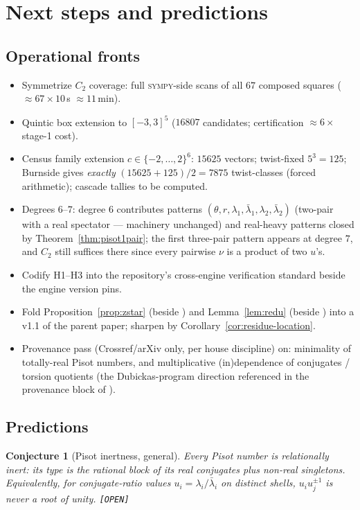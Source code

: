 \documentclass[11pt]{article}
\newcommand{\Op}{\textnormal{\texttt{[OPEN]}}}
\newcommand{\sy}{\textsc{sympy}}
\newtheorem{conjecture}[theorem]{Conjecture}
\theoremstyle{definition}
\begin{document}
\section{Next steps and predictions}\label{sec:next}

\subsection{Operational fronts}
\begin{itemize}
\item[\textbf{N1.}] Symmetrize $C_2$ coverage: full \sy-side scans of all $67$
composed squares ($\approx67\times10$\,s $\approx11$\,min).
\item[\textbf{N2.}] Quintic box extension to $[-3,3]^5$ ($16807$ candidates;
certification $\approx6\times$ stage-1 cost).
\item[\textbf{N3.}] Census family extension $c\in\{-2,\dots,2\}^6$: $15625$
vectors; twist-fixed $5^3=125$; Burnside gives \emph{exactly}
$(15625+125)/2=7875$ twist-classes (forced arithmetic); cascade tallies to be
computed.
\item[\textbf{N4.}] Degrees $6$--$7$: degree $6$ contributes patterns
$(\theta,r,\lambda_1,\bar\lambda_1,\lambda_2,\bar\lambda_2)$ (two-pair with a
real spectator --- machinery unchanged) and real-heavy patterns closed by
Theorem~\ref{thm:pisot1pair}; the first three-pair pattern appears at degree
$7$, and $C_2$ still suffices there since every pairwise $\nu$ is a product of
two $u$'s.
\item[\textbf{N5.}] Codify H1--H3 into the repository's cross-engine
verification standard beside the engine version pins.
\item[\textbf{N6.}] Fold Proposition~\ref{prop:zstar} (beside
\cite[Ex.~7.19]{relcharge}) and Lemma~\ref{lem:redu} (beside
\cite[Rem.~7.6]{relcharge}) into a v1.1 of the parent paper; sharpen
\cite[Cor.~7.16]{relcharge} by Corollary~\ref{cor:residue-location}.
\item[\textbf{N7.}] Provenance pass (Crossref/arXiv only, per house discipline)
on: minimality of totally-real Pisot numbers, and multiplicative
(in)dependence of conjugates / torsion quotients (the Dubickas-program
direction referenced in the provenance block of \cite{relcharge}).
\end{itemize}

\subsection{Predictions}
\begin{conjecture}[Pisot inertness, general]\label{conj:pisot}
Every Pisot number is relationally inert: its type is the rational block of its
real conjugates plus non-real singletons. Equivalently, for conjugate-ratio
values $u_i=\lambda_i/\bar\lambda_i$ on distinct shells, $u_iu_j^{\pm1}$ is
never a root of unity. \Op
\end{conjecture}
\end{document}
